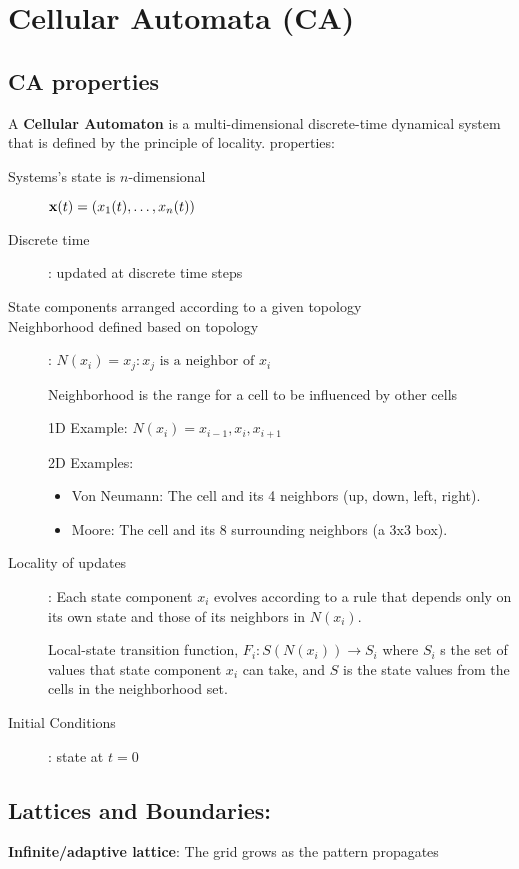 \chapter*{Cellular Automata (CA)}

\section*{CA properties}

A \textbf{Cellular Automaton} is a multi-dimensional discrete-time dynamical
system that is defined by
the principle of locality. properties:

\begin{description}
    \item[Systems's state is $n$-dimensional] $\mathbf{x}(t) = (x_1(t), \dots, x_n(t))$
    \item[Discrete time]: updated at discrete time steps
    \item[State components arranged according to a given topology]
    \item[Neighborhood defined based on topology]: $N(x_i) =
    {x_j : x_j \text{ is a neighbor of }x_i}$

    Neighborhood is the range for a cell to be influenced by other cells

    1D Example: $N(x_i)={x_{i-1},x_i,x_{i+1}}$

    2D Examples:
    \begin{itemize}
        \item Von Neumann: The cell and its 4 neighbors (up, down, left, right).
        \item Moore: The cell and its 8 surrounding neighbors (a 3x3 box).
    \end{itemize}

    \item[Locality of updates]: Each state component $x_i$ evolves according to a rule
    that depends only on its own state and those of its neighbors in $N(x_i)$.

    Local-state transition function, $F_i: S(N(x_i)) \to S_i$ where $S_i$
    s the set of values that state component $x_i$ can take,
    and $S$ is the state values from the cells in the neighborhood set.

    \item[Initial Conditions]: state at $t=0$
\end{description}

\section*{Lattices and Boundaries:}
\textbf{Infinite/adaptive lattice}: The grid grows as the pattern propagates

